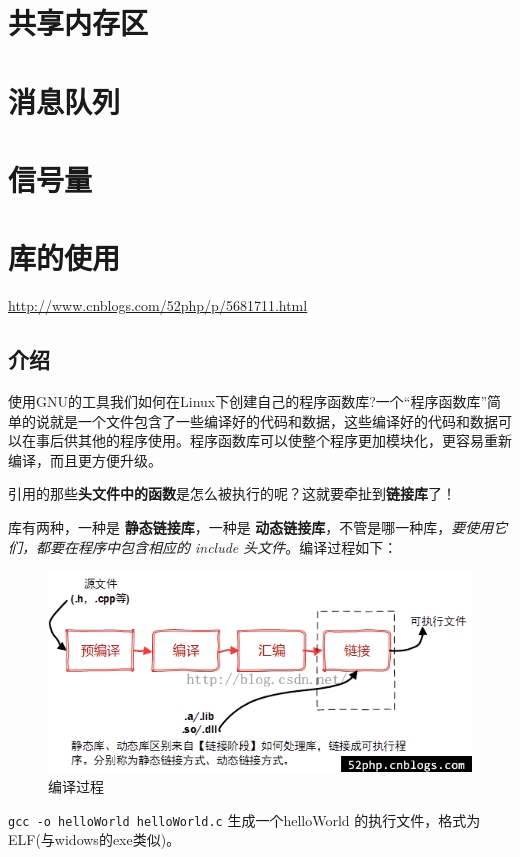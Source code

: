 \documentclass[UTF8,a4paper,12pt]{ctexbook}
\begin{document}
	\section{共享内存区}
	
	\section{消息队列}
	
	\section{信号量}
	
	\section{库的使用}
		\url{http://www.cnblogs.com/52php/p/5681711.html}
		\subsection{介绍}
			使用GNU的工具我们如何在Linux下创建自己的程序函数库?一个“程序函数库”简单的说就是一个文件包含了一些编译好的代码和数据，这些编译好的代码和数据可以在事后供其他的程序使用。程序函数库可以使整个程序更加模块化，更容易重新编译，而且更方便升级。  
			
			引用的那些\textbf{头文件中的函数}是怎么被执行的呢？这就要牵扯到\textbf{链接库}了！
			
			库有两种，一种是 \textbf{静态链接库}，一种是 \textbf{动态链接库}，不管是哪一种库，\textit{要使用它们，都要在程序中包含相应的 include 头文件}。编译过程如下：
			
			\begin{figure}[h]
				\centering
				\includegraphics[scale = 0.7]{figure/compileProcess.png}
				\caption{编译过程}
			\end{figure}
			
			\verb|gcc -o helloWorld helloWorld.c| 生成一个helloWorld 的执行文件，格式为ELF(与widows的exe类似)。
			
\end{document}
